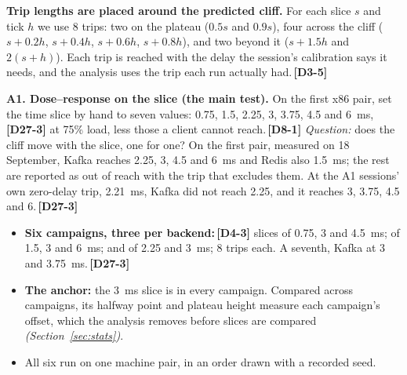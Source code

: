 \documentclass[11pt]{article}
\newcommand{\gl}[1]{{\color{soft}\itshape\small (#1)}}
\newcommand{\chgold}[1]{\,{\color{oldcol}\bfseries\footnotesize[#1]}}
\begin{document}
\textbf{Trip lengths are placed around the predicted cliff.} For each slice $s$ and tick $h$ we use 8 trips: two on the plateau ($0.5s$ and $0.9s$), four across the cliff ($s + 0.2h$, $s + 0.4h$, $s + 0.6h$, $s + 0.8h$), and two beyond it ($s + 1.5h$ and $2(s + h)$). Each trip is reached with the delay the session's calibration says it needs, and the analysis uses the trip each run actually had.\chgold{D3-5}

\textbf{A1. Dose--response on the slice (the main test).} On the first x86 pair, set the time slice by hand to seven values: 0.75, 1.5, 2.25, 3, 3.75, 4.5 and 6~ms,\chgold{D27-3} at 75\% load, less those a client cannot reach.\chgold{D8-1} \emph{Question:} does the cliff move with the slice, one for one? On the first pair, measured on 18 September, Kafka reaches 2.25, 3, 4.5 and 6~ms and Redis also 1.5~ms; the rest are reported as out of reach with the trip that excludes them. At the A1 sessions' own zero-delay trip, 2.21~ms, Kafka did not reach 2.25, and it reaches 3, 3.75, 4.5 and 6.\chgold{D27-3}
\begin{itemize}
  \item \textbf{Six campaigns, three per backend:}\chgold{D4-3} slices of 0.75, 3 and 4.5~ms; of 1.5, 3 and 6~ms; and of 2.25 and 3~ms; 8 trips each. A seventh, Kafka at 3 and 3.75~ms.\chgold{D27-3}
  \item \textbf{The anchor:} the 3~ms slice is in every campaign. Compared across campaigns, its halfway point and plateau height measure each campaign's offset, which the analysis removes before slices are compared \gl{Section~\ref{sec:stats}}.
  \item All six run on one machine pair, in an order drawn with a recorded seed.
\end{itemize}
\end{document}
